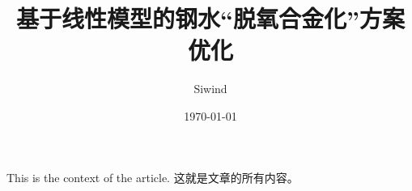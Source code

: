 \documentclass[UTF8]{ctexart}
\title{基于线性模型的钢水“脱氧合金化”方案优化}
\author{Siwind}
\date{\today}
\begin{document}
\maketitle
This is the context of the article.
这就是文章的所有内容。
\end{document}
